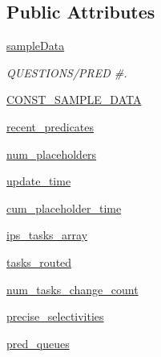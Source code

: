 \subsection*{Public Attributes}
\begin{DoxyCompactItemize}
\item 
\mbox{\hyperlink{classdynamicfilterapp_1_1test__simulations_1_1_simulation_test_a4ab28c61e1d11d91140b32be9fec0af8}{sample\+Data}}
\begin{DoxyCompactList}\small\item\em Q\+U\+E\+S\+T\+I\+O\+N\+S/\+P\+R\+ED \#. \end{DoxyCompactList}\item 
\mbox{\hyperlink{classdynamicfilterapp_1_1test__simulations_1_1_simulation_test_ab5fa627b88e4ce7c247f5e7c9680386e}{C\+O\+N\+S\+T\+\_\+\+S\+A\+M\+P\+L\+E\+\_\+\+D\+A\+TA}}
\item 
\mbox{\hyperlink{classdynamicfilterapp_1_1test__simulations_1_1_simulation_test_aa35f53b06211af338f382ceb3de64564}{recent\+\_\+predicates}}
\item 
\mbox{\hyperlink{classdynamicfilterapp_1_1test__simulations_1_1_simulation_test_a8df699f4f7e003ed76896120d241ec44}{num\+\_\+placeholders}}
\item 
\mbox{\hyperlink{classdynamicfilterapp_1_1test__simulations_1_1_simulation_test_ae989b8400163febdffa0d452c256edd4}{update\+\_\+time}}
\item 
\mbox{\hyperlink{classdynamicfilterapp_1_1test__simulations_1_1_simulation_test_ac5deee7873cfc1e9e8c2190d2e165bc7}{cum\+\_\+placeholder\+\_\+time}}
\item 
\mbox{\hyperlink{classdynamicfilterapp_1_1test__simulations_1_1_simulation_test_a4a08524fd307d06eeb927b9201284433}{ips\+\_\+tasks\+\_\+array}}
\item 
\mbox{\hyperlink{classdynamicfilterapp_1_1test__simulations_1_1_simulation_test_ac272684d310568f016d065b280e41d33}{tasks\+\_\+routed}}
\item 
\mbox{\hyperlink{classdynamicfilterapp_1_1test__simulations_1_1_simulation_test_a782fa7450f2f94924a3170689bdf5d39}{num\+\_\+tasks\+\_\+change\+\_\+count}}
\item 
\mbox{\hyperlink{classdynamicfilterapp_1_1test__simulations_1_1_simulation_test_ac31632c95ded6ca45f6cc4d9b7960dc5}{precise\+\_\+selectivities}}
\item 
\mbox{\hyperlink{classdynamicfilterapp_1_1test__simulations_1_1_simulation_test_a1f9c704f13a96f3bf7811d2101c296e8}{pred\+\_\+queues}}
\item 

\end{DoxyCompactItemize}
